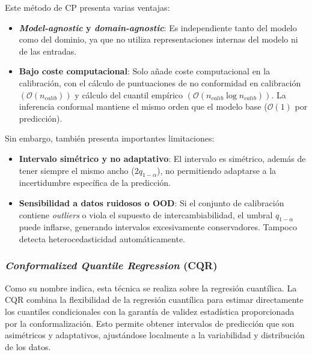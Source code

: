 Este método de CP presenta varias ventajas: 

\begin{itemize}
    \item \textbf{\textit{Model-agnostic} y \textit{domain-agnostic}}: Es independiente tanto del modelo como 
    del dominio, ya que no utiliza representaciones internas del modelo ni de las entradas. 
    
    \item \textbf{Bajo coste computacional}: Solo añade coste computacional en la calibración, con el 
    cálculo de puntuaciones de no conformidad en calibración $\left( \mathcal{O}(n_{calib}) \right)$ y
    cálculo del cuantil empírico $\left( \mathcal{O}(n_{calib} \log n_{calib}) \right)$. La inferencia
    conformal mantiene el mismo orden que el modelo base ($\mathcal{O}(1)$ por predicción). 

\end{itemize}

Sin embargo, también presenta importantes limitaciones: 

\begin{itemize}
    
    \item \textbf{Intervalo simétrico y no adaptativo}: El intervalo es simétrico, además de tener siempre el 
    mismo ancho ($2q_{1-\alpha}$), no permitiendo adaptarse a la incertidumbre específica de la predicción. 

    \item \textbf{Sensibilidad a datos ruidosos o OOD}: 
    Si el conjunto de calibración contiene \textit{outliers} o viola el supuesto de intercambiabilidad, el 
    umbral \(q_{1-\alpha}\) puede inflarse, generando intervalos excesivamente conservadores. Tampoco detecta 
    heterocedasticidad automáticamente.

\end{itemize}


\subsubsection{\textit{Conformalized Quantile Regression} (CQR)}

Como su nombre indica, esta técnica se realiza sobre la regresión cuantílica. La CQR \cite{romano2019}
combina la flexibilidad de la regresión cuantílica para estimar directamente los cuantiles condicionales con 
la garantía de validez estadística proporcionada por la conformalización. Esto permite obtener intervalos de 
predicción que son asimétricos y adaptativos, ajustándose localmente a la variabilidad y distribución de los 
datos.

